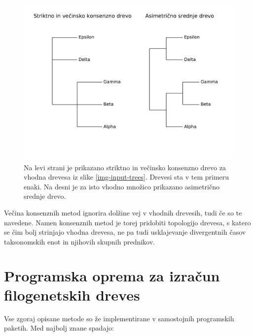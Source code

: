 \documentclass[a4paper, 12pt]{book}
\begin{document}
\begin{figure}[h!]
	\begin{center}
		\includegraphics[scale=0.65, clip=true, trim=0 3cm 0 9mm]{gfx/strict_majority_amt_ex.pdf}
	\end{center}
	\caption{Na levi strani je prikazano striktno in večinsko konsenzno drevo za vhodna drevesa iz slike \ref{img-input-trees}. Drevesi sta v tem primeru enaki. Na desni je za isto vhodno množico prikazano asimetrično srednje drevo.}
	\label{img-strict-majority-amt-example}
\end{figure}

Večina konsenznih metod ignorira dolžine vej v vhodnih drevesih, tudi če so te navedene. Namen konsenznih metod je torej pridobiti topologijo drevesa, s katero se čim bolj strinjajo vhodna drevesa, ne pa tudi usklajevanje divergentnih časov taksonomskih enot in njihovih skupnih prednikov.  


\section{Programska oprema za izračun filogenetskih dreves}
Vse zgoraj opisane metode so že implementirane v samostojnih programskih paketih. Med najbolj znane spadajo:
\end{document}
